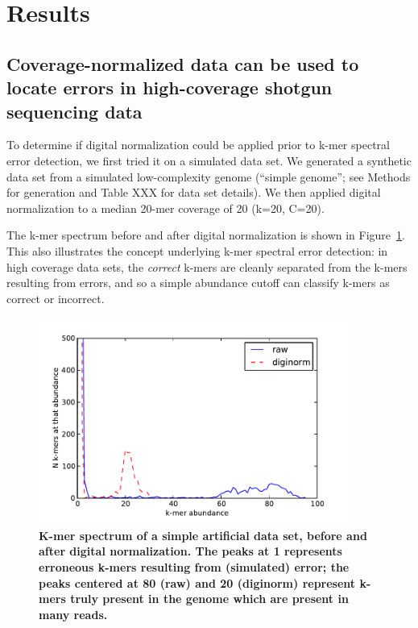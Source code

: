 \documentclass{article}
\begin{document}
\section{Results}

\subsection{Coverage-normalized data can be used to locate
errors in high-coverage shotgun sequencing data}

To determine if digital normalization could be applied prior to k-mer
spectral error detection, we first tried it on a simulated data set.
We generated a synthetic data set from
a simulated low-complexity genome (``simple genome''; see Methods for
generation and Table XXX for data set details). We then applied
digital normalization to a median 20-mer coverage of 20 (k=20, C=20).

The k-mer spectrum before and after digital normalization is shown in
Figure~\ref{fig:spectrum}.  This also illustrates the concept
underlying k-mer spectral error detection: in high coverage data sets,
the {\em correct} k-mers are cleanly separated from the k-mers resulting
from errors, and so a simple abundance cutoff can classify k-mers as
correct or incorrect.

\begin{figure}[!ht]
 \centerline{\includegraphics[width=4in]{./figures/kmer-spectrum}}
\caption{\bf K-mer spectrum of a simple artificial data set, before and after digital normalization.  The peaks at 1 represents erroneous k-mers resulting
from (simulated) error; the peaks centered at 80 (raw) and 20 (diginorm)
represent k-mers truly present in the genome which are present in many reads.}
\label{fig:spectrum}
\end{figure}

\end{document}
